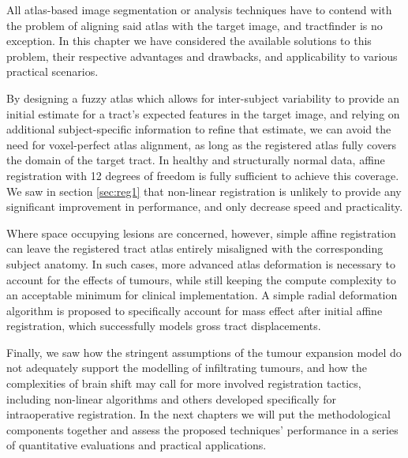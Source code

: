 All atlas-based image segmentation or analysis techniques have to contend with the problem of aligning said atlas with the target image, and tractfinder is no exception.
In this chapter we have considered the available solutions to this problem, their respective advantages and drawbacks, and applicability to various practical scenarios.

By designing a fuzzy atlas which allows for inter-subject variability to provide an initial estimate for a tract's expected features in the target image, and relying on additional subject-specific information to refine that estimate, we can avoid the need for voxel-perfect atlas alignment, as long as the registered atlas fully covers the domain of the target tract.
In healthy and structurally normal data, affine registration with 12 degrees of freedom is fully sufficient to achieve this coverage.
We saw in section \ref{sec:reg1} that non-linear registration is unlikely to provide any significant improvement in performance, and only decrease speed and practicality.

Where space occupying lesions are concerned, however, simple affine registration can leave the registered tract atlas entirely misaligned with the corresponding subject anatomy.
In such cases, more advanced atlas deformation is necessary to account for the effects of tumours, while still keeping the compute complexity to an acceptable minimum for clinical implementation.
A simple radial deformation algorithm is proposed to specifically account for mass effect after initial affine registration, which successfully models gross tract displacements.

Finally, we saw how the stringent assumptions of the tumour expansion model do not adequately support the modelling of infiltrating tumours, and how the complexities of brain shift may call for more involved registration tactics, including non-linear algorithms and others developed specifically for intraoperative registration.
In the next chapters we will put the methodological components together and assess the proposed techniques' performance in a series of quantitative evaluations and practical applications.
